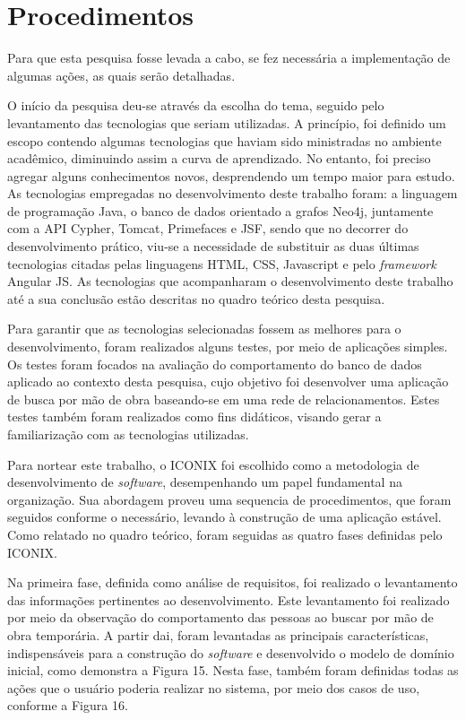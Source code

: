 \section{Procedimentos}

\par Para que esta pesquisa fosse levada a cabo, se fez necessária a implementação de algumas ações, as quais serão detalhadas.

\par O início da pesquisa deu-se através da escolha do tema, seguido pelo levantamento das tecnologias que seriam utilizadas. A princípio, foi definido um escopo contendo algumas tecnologias que haviam sido ministradas no ambiente acadêmico, diminuindo assim a curva de aprendizado. No entanto, foi preciso agregar alguns conhecimentos novos, desprendendo um tempo maior para estudo. As tecnologias empregadas no desenvolvimento deste trabalho foram: a linguagem de programação Java, o banco de dados orientado a grafos Neo4j, juntamente com a API Cypher, Tomcat, Primefaces e JSF, sendo que no decorrer do desenvolvimento prático, viu-se a necessidade de substituir as duas últimas tecnologias citadas pelas linguagens HTML, CSS, Javascript e pelo \textit{framework} Angular JS. As tecnologias que acompanharam o desenvolvimento deste trabalho até a sua conclusão estão descritas no quadro teórico desta pesquisa.

\par Para garantir que as tecnologias selecionadas fossem as melhores para o desenvolvimento, foram realizados alguns testes, por meio de aplicações simples. Os testes foram focados na avaliação do comportamento do banco de dados aplicado ao contexto desta pesquisa, cujo objetivo foi desenvolver uma aplicação de busca por mão de obra baseando-se em uma rede de relacionamentos. Estes testes também foram realizados como fins didáticos, visando gerar a familiarização com as tecnologias utilizadas.

\par Para nortear este trabalho, o ICONIX foi escolhido como a metodologia de desenvolvimento de \textit{software}, desempenhando um papel fundamental na organização. Sua abordagem proveu uma sequencia de procedimentos, que foram seguidos conforme o necessário, levando à construção de uma aplicação estável. Como relatado no quadro teórico, foram seguidas as quatro fases definidas pelo ICONIX.

\par Na primeira fase, definida como análise de requisitos, foi realizado o levantamento das informações pertinentes ao desenvolvimento. Este levantamento foi realizado por meio da observação do comportamento das pessoas ao buscar por mão de obra temporária. A partir dai, foram levantadas as principais características, indispensáveis para a construção do \textit{software} e desenvolvido o modelo de domínio inicial, como demonstra a Figura 15. Nesta fase, também foram definidas todas as ações que o usuário poderia realizar no sistema, por meio dos casos de uso, conforme a Figura 16.

